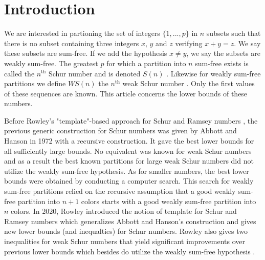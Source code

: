 \section{Introduction}

We are interested in partioning the set of integers \(\{1, ..., p\}\) in \(n\) subsets such that there is no subset 
containing three integers \(x\), \(y\) and \(z\) verifying \(x + y = z\). We say these subsets are sum-free. If we 
add the hypothesis \(x \neq y\), we say the subsets are weakly sum-free. The greatest \(p\) for which a 
partition into \(n\) sum-free exists is called the \(n^{\text{th}}\) Schur number and is denoted \(S(n)\) 
\cite{Schur1917}. Likewise for weakly sum-free partitions we define \(WS(n)\) the \(n^{\text{th}}\) weak Schur 
number \cite{Irving1973}. Only the first values of these sequences are known. This article concerns the lower 
bounds of these numbers.

\par Before Rowley's "template"-based approach for Schur and Ramsey numbers \cite{RowleyRamsey}, the 
previous generic construction for Schur numbers was given by Abbott and Hanson \cite{AbbottHanson} in 1972 
with a recursive construction. It gave the best lower bounds for all sufficiently large bounds. No equivalent 
was known for weak Schur numbers and as a result the best known partitions for large weak Schur numbers 
did not utilize the weakly sum-free hypothesis. As for smaller numbers, the best lower bounds were obtained 
by conducting a computer search. This search for weakly sum-free partitions relied on the recursive assumption 
that a good weakly sum-free partition into \(n+1\) colors starts with a good weakly sum-free partition into \(n\) 
colors. In 2020, Rowley introduced the notion of template for Schur and Ramsey numbers which generalizes 
Abbott and Hanson's construction and gives new lower bounds (and inequalties) for Schur numbers. Rowley also 
gives two inequalities for weak Schur numbers that yield significant improvements over previous lower bounds 
which besides do utilize the weakly sum-free hypothesis \cite{RowleyWS}.

\renewcommand{\arraystretch}{1.5}

